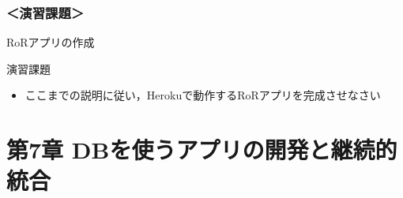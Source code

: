 \documentclass[t, aspectratio=169]{beamer}
\begin{document}
\section{＜演習課題＞}
\label{sec-6-4}
\begin{frame}[label=sec-6-4-1]{RoRアプリの作成}
\begin{block}{演習課題}
\begin{itemize}
\item ここまでの説明に従い，Herokuで動作するRoRアプリを完成させなさい
\end{itemize}
\end{block}
\end{frame}
\part{第7章 DBを使うアプリの開発と継続的統合}
\label{sec-7}
\end{document}

